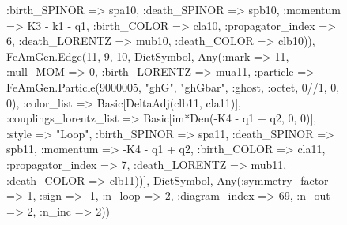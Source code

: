 \documentclass{revtex4}
\begin{document}
\begin{figure}[!htb]
\begin{center}
{:birth_SPINOR => spa10, :death_SPINOR => spb10, :momentum => K3 - k1 - q1, :birth_COLOR => cla10, :propagator_index => 6, :death_LORENTZ => mub10, :death_COLOR => clb10)), FeAmGen.Edge(11, 9, 10, Dict{Symbol, Any}(:mark => 11, :null_MOM => 0, :birth_LORENTZ => mua11, :particle => FeAmGen.Particle(9000005, "ghG", "ghGbar", :ghost, :octet, 0//1, 0, 0), :color_list => Basic[DeltaAdj(clb11, cla11)], :couplings_lorentz_list => Basic[im*Den(-K4 - q1 + q2, 0, 0)], :style => "Loop", :birth_SPINOR => spa11, :death_SPINOR => spb11, :momentum => -K4 - q1 + q2, :birth_COLOR => cla11, :propagator_index => 7, :death_LORENTZ => mub11, :death_COLOR => clb11))], Dict{Symbol, Any}(:symmetry_factor => 1, :sign => -1, :n_loop => 2, :diagram_index => 69, :n_out => 2, :n_inc => 2)) 
}
\end{center}
\end{figure}
\end{document}
